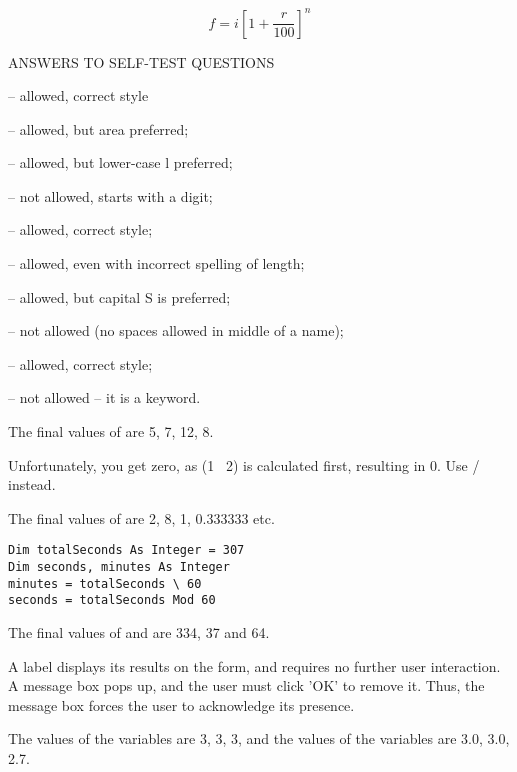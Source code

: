 \begin{enumChapter}
				\begin{equation*}
					f = i \left[ 1 + \frac{r}{100} \right]^n
				\end{equation*}
		\end{enumChapter}
		
		\begin{stab}
			ANSWERS TO SELF-TEST QUESTIONS \tcblower
			\begin{enumChapter}
			\item	{} – allowed, correct style

						 – allowed, but area preferred;

						 – allowed, but lower-case l preferred;

						 – not allowed, starts with a digit;

						 – allowed, correct style;

					 – allowed, even with incorrect spelling of length;

					 – allowed, but capital S is preferred;

					 – not allowed (no spaces allowed in middle of a name);

					 – allowed, correct style;

					 – not allowed – it is a keyword.
				\item	The final values of  are 5, 7, 12, 8.
				\item	Unfortunately, you get zero, as (1 \ 2) is calculated first, resulting in 0. Use / instead.
				\item	The final values of  are 2, 8, 1, 0.333333 etc.
				\item	\begin{lstlisting}
Dim totalSeconds As Integer = 307
Dim seconds, minutes As Integer
minutes = totalSeconds \ 60
seconds = totalSeconds Mod 60
					\end{lstlisting}
				\item	The final values of  and  are 334, 37 and 64.
				\item	A label displays its results on the form, and requires no further user interaction. A message box pops up, and the user must click 'OK' to remove it. Thus, the message box forces the user to acknowledge its presence.
				\item	The values of the  variables  are 3, 3, 3, and the values of the  variables  are 3.0, 3.0, 2.7.
			\end{enumChapter}
		\end{stab}

